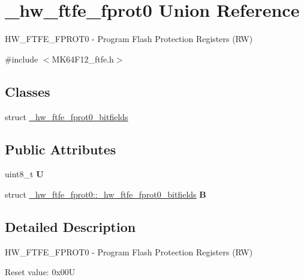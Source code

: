 \hypertarget{union__hw__ftfe__fprot0}{}\section{\+\_\+hw\+\_\+ftfe\+\_\+fprot0 Union Reference}
\label{union__hw__ftfe__fprot0}


H\+W\+\_\+\+F\+T\+F\+E\+\_\+\+F\+P\+R\+O\+T0 -\/ Program Flash Protection Registers (RW)  




{\ttfamily \#include $<$M\+K64\+F12\+\_\+ftfe.\+h$>$}

\subsection*{Classes}
\begin{DoxyCompactItemize}
\item 
struct \hyperlink{struct__hw__ftfe__fprot0_1_1__hw__ftfe__fprot0__bitfields}{\+\_\+hw\+\_\+ftfe\+\_\+fprot0\+\_\+bitfields}
\end{DoxyCompactItemize}
\subsection*{Public Attributes}
\begin{DoxyCompactItemize}
\item 
uint8\+\_\+t {\bfseries U}\hypertarget{union__hw__ftfe__fprot0_a61209e41b2d6aa01529e67b20794cf82}{}\label{union__hw__ftfe__fprot0_a61209e41b2d6aa01529e67b20794cf82}

\item 
struct \hyperlink{struct__hw__ftfe__fprot0_1_1__hw__ftfe__fprot0__bitfields}{\+\_\+hw\+\_\+ftfe\+\_\+fprot0\+::\+\_\+hw\+\_\+ftfe\+\_\+fprot0\+\_\+bitfields} {\bfseries B}\hypertarget{union__hw__ftfe__fprot0_a07e4b50d62f892525e825e537f9b565a}{}\label{union__hw__ftfe__fprot0_a07e4b50d62f892525e825e537f9b565a}

\end{DoxyCompactItemize}


\subsection{Detailed Description}
H\+W\+\_\+\+F\+T\+F\+E\+\_\+\+F\+P\+R\+O\+T0 -\/ Program Flash Protection Registers (RW) 

Reset value\+: 0x00U

